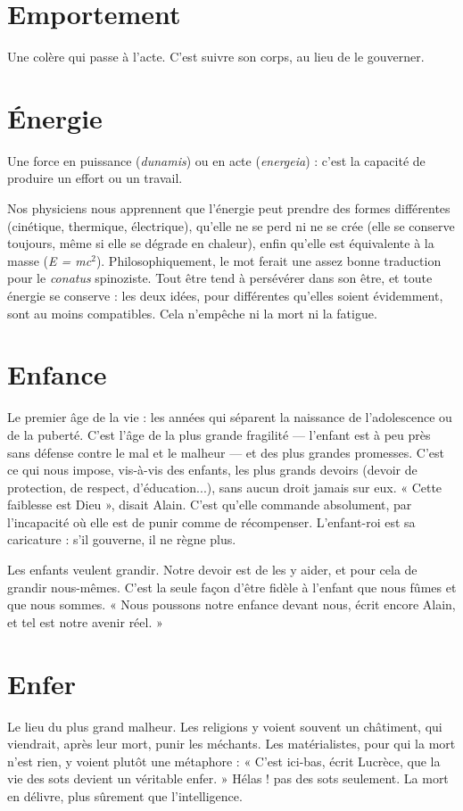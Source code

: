\section{Emportement}
Une colère qui passe à l’acte. C’est suivre son corps, au
lieu de le gouverner.

\section{Énergie}
Une force en puissance ({\it dunamis}) ou en acte ({\it energeia}) : c’est la
capacité de produire un effort ou un travail.

Nos physiciens nous apprennent que l'énergie peut prendre des formes différentes
(cinétique, thermique, électrique), qu’elle ne se perd ni ne se crée
(elle se conserve toujours, même si elle se dégrade en chaleur), enfin qu’elle est
équivalente à la masse ({\it E = mc$^2$}). Philosophiquement, le mot ferait une assez
bonne traduction pour le {\it conatus} spinoziste. Tout être tend à persévérer dans
son être, et toute énergie se conserve : les deux idées, pour différentes qu’elles
soient évidemment, sont au moins compatibles. Cela n’empêche ni la mort ni
la fatigue.

\section{Enfance}
Le premier âge de la vie : les années qui séparent la naissance de
l’adolescence ou de la puberté. C’est l’âge de la plus grande fragilité —
l'enfant est à peu près sans défense contre le mal et le malheur — et des
plus grandes promesses. C’est ce qui nous impose, vis-à-vis des enfants, les plus
grands devoirs (devoir de protection, de respect, d’éducation...), sans aucun
droit jamais sur eux. « Cette faiblesse est Dieu », disait Alain. C’est qu’elle commande
absolument, par l'incapacité où elle est de punir comme de récompenser.
L’enfant-roi est sa caricature : s’il gouverne, il ne règne plus.

Les enfants veulent grandir. Notre devoir est de les y aider, et pour cela de
grandir nous-mêmes. C’est la seule façon d’être fidèle à l'enfant que nous fûmes
et que nous sommes. « Nous poussons notre enfance devant nous, écrit encore
Alain, et tel est notre avenir réel. »

\section{Enfer}
Le lieu du plus grand malheur. Les religions y voient souvent un
châtiment, qui viendrait, après leur mort, punir les méchants. Les
matérialistes, pour qui la mort n’est rien, y voient plutôt une métaphore :
« C’est ici-bas, écrit Lucrèce, que la vie des sots devient un véritable enfer. »
Hélas ! pas des sots seulement. La mort en délivre, plus sûrement que l’intelligence.

